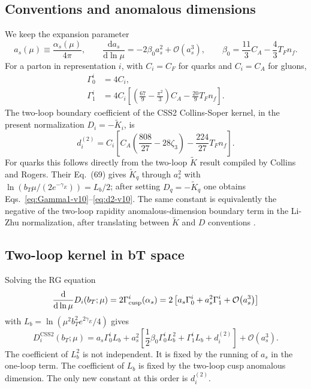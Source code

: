 \documentclass[11pt]{article}
\newcommand{\dd}{\mathrm{d}}
\newcommand{\order}[1]{\mathcal{O}\!\left(#1\right)}
\newcommand{\CSS}{\mathrm{CSS2}}
\begin{document}
\subsection{Conventions and anomalous dimensions}

We keep the expansion parameter
\begin{equation}
  a_s(\mu)\equiv \frac{\alpha_s(\mu)}{4\pi},
  \qquad
  \frac{\dd a_s}{\dd\ln\mu}
  =-2\beta_0 a_s^2+\order{a_s^3},
  \qquad
  \beta_0=\frac{11}{3}C_A-\frac{4}{3}T_F n_f .
  \label{eq:beta0-v10}
\end{equation}
For a parton in representation $i$, with $C_i=C_F$ for quarks and $C_i=C_A$ for gluons,
\begin{align}
  \Gamma_0^i &=4C_i,
  \label{eq:Gamma0-v10}
  \\
  \Gamma_1^i
  &=4C_i\left[
      \left(\frac{67}{9}-\frac{\pi^2}{3}\right)C_A
      -\frac{20}{9}T_F n_f
    \right].
  \label{eq:Gamma1-v10}
\end{align}
The two-loop boundary coefficient of the CSS2 Collins-Soper kernel, in the present
normalization $D_i=-\widetilde K_i$, is
\begin{equation}
  d_i^{(2)}
  =C_i\left[
      C_A\left(\frac{808}{27}-28\zeta_3\right)
      -\frac{224}{27}T_F n_f
    \right].
  \label{eq:d2-v10}
\end{equation}
For quarks this follows directly from the two-loop $\widetilde K$ result compiled by
Collins and Rogers.  Their Eq.~(69) gives $\widetilde K_q$ through $a_s^2$ with
$\ln(b_T\mu/(2e^{-\gamma_E}))=L_b/2$; after setting $D_q=-\widetilde K_q$ one obtains
Eqs.~\eqref{eq:Gamma1-v10}--\eqref{eq:d2-v10}.  The same constant is equivalently the
negative of the two-loop rapidity anomalous-dimension boundary term in the Li-Zhu
normalization, after translating between $\widetilde K$ and $D$ conventions
\cite{CollinsRogers2017,LiZhu2017}.

\subsection{Two-loop kernel in bT space}

Solving the RG equation
\begin{equation}
  \frac{\dd}{\dd\ln\mu}D_i(b_T;\mu)
  =2\Gamma_{\rm cusp}^i(\alpha_s)
  =2\left[a_s\Gamma_0^i+a_s^2\Gamma_1^i+\order{a_s^3}\right]
  \label{eq:D-rg-v10}
\end{equation}
with $L_b=\ln(\mu^2b_T^2e^{2\gamma_E}/4)$ gives
\begin{equation}
  \boxed{
  D_i^{\CSS}(b_T;\mu)
  =a_s\Gamma_0^i L_b
  +a_s^2\left[
      \frac{1}{2}\beta_0\Gamma_0^i L_b^2
      +\Gamma_1^i L_b
      +d_i^{(2)}
    \right]
  +\order{a_s^3}.}
  \label{eq:D-b-two-loop-v10}
\end{equation}
The coefficient of $L_b^2$ is not independent.  It is fixed by the running of $a_s$ in
the one-loop term.  The coefficient of $L_b$ is fixed by the two-loop cusp anomalous
dimension.  The only new constant at this order is $d_i^{(2)}$.
\end{document}
